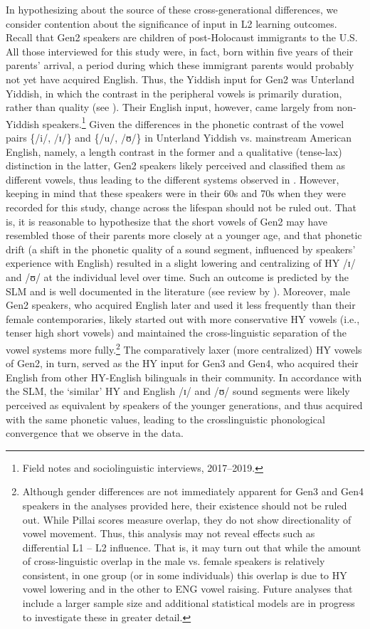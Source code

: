\documentclass[output=paper]{langsci/langscibook}
\begin{document}
In hypothesizing about the source of these cross-generational differences, we consider  contention about the significance of input in L2 learning outcomes. Recall that Gen2 speakers are children of post-Holocaust immigrants to the U.S. All those interviewed for this study were, in fact, born within five years of their parents’ arrival, a period during which these immigrant parents would probably not yet have acquired English. Thus, the Yiddish input for Gen2 was Unterland Yiddish, in which the contrast in the peripheral vowels is primarily duration, rather than quality (see \citealt{Nove2020}). Their English input, however, came largely from non-Yiddish speakers.\footnote{Field notes and sociolinguistic interviews, 2017--2019.} Given the differences in the phonetic contrast of the vowel pairs \{/i/, /ɪ/\} and \{/u/, /ʊ/\} in Unterland Yiddish vs. mainstream American English, namely, a length contrast in the former and a qualitative (tense-lax) distinction in the latter, Gen2 speakers likely perceived and classified them as different vowels, thus leading to the different systems observed in . However, keeping in mind that these speakers were in their 60s and 70s when they were recorded for this study, change across the lifespan should not be ruled out. That is, it is reasonable to hypothesize that the short vowels of Gen2 may have resembled those of their parents more closely at a younger age, and that phonetic drift (a shift in the phonetic quality of a sound segment, influenced by speakers’ experience with English) resulted in a slight lowering and centralizing of HY /ɪ/ and /ʊ/ at the individual level over time. Such an outcome is predicted by the SLM and is well documented in the literature (see review by \citealt{Chang2019}). Moreover, male Gen2 speakers, who acquired English later and used it less frequently than their female contemporaries, likely started out with more conservative HY vowels (i.e., tenser high short vowels) and maintained the cross-linguistic separation of the vowel systems more fully.\footnote{Although gender differences are not immediately apparent for Gen3 and Gen4 speakers in the analyses provided here, their existence should not be ruled out. While Pillai scores measure overlap, they do not show directionality of vowel movement. Thus, this analysis may not reveal effects such as differential L1 – L2 influence. That is, it may turn out that while the amount of cross-linguistic overlap in the male vs. female speakers is relatively consistent, in one group (or in some individuals) this overlap is due to HY vowel lowering and in the other to ENG vowel raising. Future analyses that include a larger sample size and additional statistical models are in progress to investigate these in greater detail.} The comparatively laxer (more centralized) HY vowels of Gen2, in turn, served as the HY input for Gen3 and Gen4, who acquired their English from other HY-English bilinguals in their community. In accordance with the SLM, the ‘similar’ HY and English /ɪ/ and /ʊ/ sound segments were likely perceived as equivalent by speakers of the younger generations, and thus acquired with the same phonetic values, leading to the crosslinguistic phonological convergence that we observe in the data. %
\end{document}
